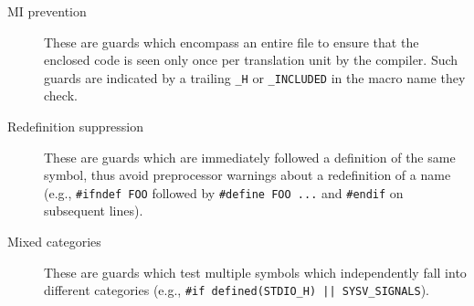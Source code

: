 \begin{description}
\item[MI prevention] These are guards which encompass an entire file to
      ensure that the enclosed code is seen only once per translation
      unit by the compiler.  Such guards are indicated by a trailing
      \texttt{_H} or \texttt{_INCLUDED} in the macro name they check.

\item[Redefinition suppression] These are guards which are immediately
      followed a definition of the same symbol, thus avoid preprocessor
      warnings about a redefinition of a name (e.g., \texttt{#ifndef
      FOO} followed by \texttt{#define FOO ...} and \texttt{#endif} on
      subsequent lines).

\item[Mixed categories] These are guards which test multiple symbols
      which independently fall into different categories (e.g.,
      \texttt{#if defined(STDIO_H) || SYSV_SIGNALS}).

\end{description}

